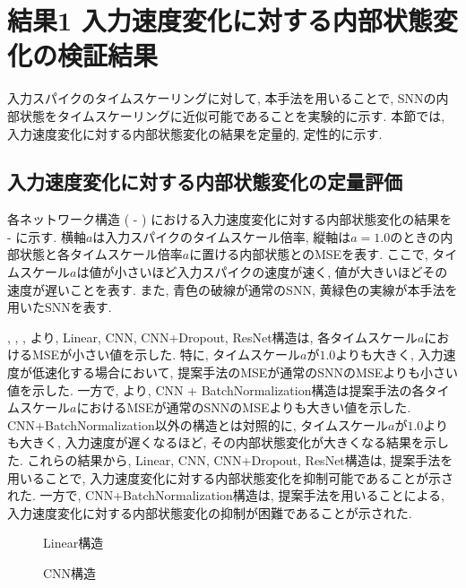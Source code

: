 \section{結果1 入力速度変化に対する内部状態変化の検証結果}
入力スパイクのタイムスケーリングに対して, 本手法を用いることで, SNNの内部状態をタイムスケーリングに近似可能であることを実験的に示す.
本節では, 入力速度変化に対する内部状態変化の結果を定量的, 定性的に示す.

\subsection{入力速度変化に対する内部状態変化の定量評価}
各ネットワーク構造 ( - ) における入力速度変化に対する内部状態変化の結果を -  に示す.
横軸$a$は入力スパイクのタイムスケール倍率, 縦軸は$a=1.0$のときの内部状態と各タイムスケール倍率$a$に置ける内部状態とのMSEを表す.
ここで, タイムスケール$a$は値が小さいほど入力スパイクの速度が速く, 値が大きいほどその速度が遅いことを表す.
また, 青色の破線が通常のSNN, 黄緑色の実線が本手法を用いたSNNを表す.

, , , より, Linear, CNN, CNN+Dropout, ResNet構造は, 各タイムスケール$a$におけるMSEが小さい値を示した.
特に, タイムスケール$a$が$1.0$よりも大きく, 入力速度が低速化する場合において, 提案手法のMSEが通常のSNNのMSEよりも小さい値を示した.
一方で, より, CNN + BatchNormalization構造は提案手法の各タイムスケール$a$におけるMSEが通常のSNNのMSEよりも大きい値を示した.
CNN+BatchNormalization以外の構造とは対照的に, タイムスケール$a$が$1.0$よりも大きく, 入力速度が遅くなるほど, その内部状態変化が大きくなる結果を示した.
これらの結果から, Linear, CNN, CNN+Dropout, ResNet構造は, 提案手法を用いることで, 入力速度変化に対する内部状態変化を抑制可能であることが示された.
一方で, CNN+BatchNormalization構造は, 提案手法を用いることによる, 入力速度変化に対する内部状態変化の抑制が困難であることが示された.

\begin{figure}[htb]
    \centering
    
    \caption{Linear構造}
    \label{fig:result1:1:linear}
\end{figure}

\begin{figure}[htb]
    \centering
    
    \caption{CNN構造}
    \label{fig:result1:1:cnn}
\end{figure}

